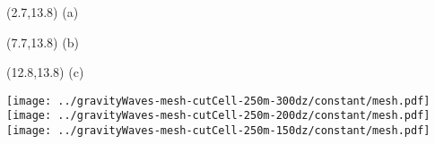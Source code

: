 \documentclass{article}
\begin{document}
\centering
\TPMargin{2pt}
\begin{textblock}{0.5}(2.7,13.8)
\normalsize
(a)
\end{textblock}
\begin{textblock}{1}(7.7,13.8)
\normalsize
(b)
\end{textblock}
\begin{textblock}{1}(12.8,13.8)
\normalsize
(c)
\end{textblock}
\texttt{[image: ../gravityWaves-mesh-cutCell-250m-300dz/constant/mesh.pdf]}
\texttt{[image: ../gravityWaves-mesh-cutCell-250m-200dz/constant/mesh.pdf]}
\texttt{[image: ../gravityWaves-mesh-cutCell-250m-150dz/constant/mesh.pdf]}
\end{document}

